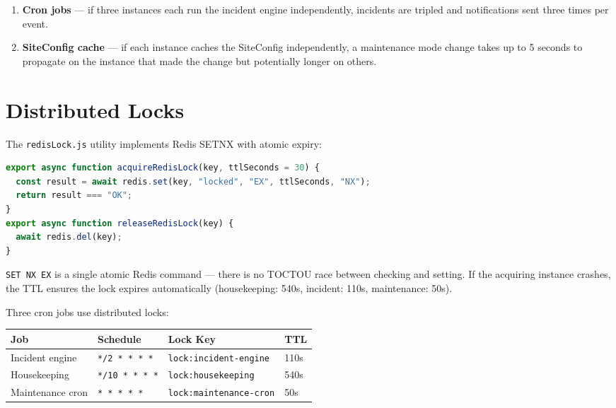 \documentclass[11pt,a4paper,twoside]{book}
\newcommand{\th}[1]{\textbf{\color{white}#1}}
\begin{document}
\begin{enumerate}[leftmargin=1.5em]
  \item \textbf{Cron jobs} — if three instances each run the incident engine independently, incidents are tripled and notifications sent three times per event.
  \item \textbf{SiteConfig cache} — if each instance caches the SiteConfig independently, a maintenance mode change takes up to 5 seconds to propagate on the instance that made the change but potentially longer on others.
\end{enumerate}

\section{Distributed Locks}

The \texttt{redisLock.js} utility implements Redis SETNX with atomic expiry:

\begin{lstlisting}[language=JavaScript,caption={Distributed lock (utils/redisLock.js)}]
export async function acquireRedisLock(key, ttlSeconds = 30) {
  const result = await redis.set(key, "locked", "EX", ttlSeconds, "NX");
  return result === "OK";
}
export async function releaseRedisLock(key) {
  await redis.del(key);
}
\end{lstlisting}

\texttt{SET NX EX} is a single atomic Redis command — there is no
TOCTOU race between checking and setting.  If the acquiring instance crashes,
the TTL ensures the lock expires automatically (housekeeping: 540s, incident:
110s, maintenance: 50s).

Three cron jobs use distributed locks:

\begin{center}\small
\begin{tabular}{p{3.5cm}p{2cm}p{3cm}p{4cm}}
\toprule
\rowcolor{headbg}\th{Job} & \th{Schedule} & \th{Lock Key} & \th{TTL} \\
\midrule
Incident engine    & \texttt{*/2 * * * *} & \texttt{lock:incident-engine}  & 110s \\
\rowcolor{rowalt}Housekeeping       & \texttt{*/10 * * * *} & \texttt{lock:housekeeping}     & 540s \\
Maintenance cron   & \texttt{* * * * *}   & \texttt{lock:maintenance-cron} & 50s \\
\bottomrule
\end{tabular}
\end{center}
\end{document}
